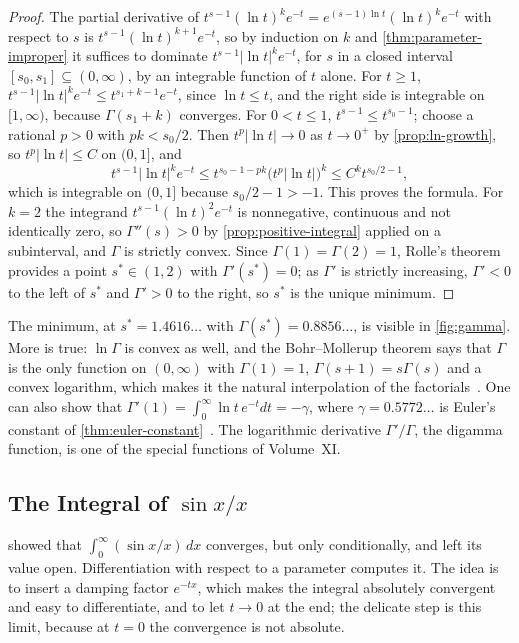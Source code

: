 \begin{proof}
The partial derivative of $t^{s-1}(\ln t)^ke^{-t}=e^{(s-1)\ln t}(\ln t)^ke^{-t}$ with respect to $s$ is $t^{s-1}(\ln t)^{k+1}e^{-t}$, so by induction on $k$ and \cref{thm:parameter-improper} it suffices to dominate $t^{s-1}|\ln t|^ke^{-t}$, for $s$ in a closed interval $[s_0,s_1]\subseteq(0,\infty)$, by an integrable function of $t$ alone. For $t\ge1$, $t^{s-1}|\ln t|^ke^{-t}\le t^{s_1+k-1}e^{-t}$, since $\ln t\le t$, and the right side is integrable on $[1,\infty)$, because $\Gamma(s_1+k)$ converges. For $0<t\le1$, $t^{s-1}\le t^{s_0-1}$; choose a rational $p>0$ with $pk<s_0/2$. Then $t^{p}|\ln t|\to0$ as $t\to0^+$ by \cref{prop:ln-growth}, so $t^p|\ln t|\le C$ on $(0,1]$, and
\[
t^{s-1}|\ln t|^ke^{-t}\le t^{s_0-1-pk}\bigl(t^p|\ln t|\bigr)^k\le C^kt^{s_0/2-1},
\]
which is integrable on $(0,1]$ because $s_0/2-1>-1$. This proves the formula. For $k=2$ the integrand $t^{s-1}(\ln t)^2e^{-t}$ is nonnegative, continuous and not identically zero, so $\Gamma''(s)>0$ by \cref{prop:positive-integral} applied on a subinterval, and $\Gamma$ is strictly convex. Since $\Gamma(1)=\Gamma(2)=1$, Rolle's theorem provides a point $s^*\in(1,2)$ with $\Gamma'(s^*)=0$; as $\Gamma'$ is strictly increasing, $\Gamma'<0$ to the left of $s^*$ and $\Gamma'>0$ to the right, so $s^*$ is the unique minimum.
\end{proof}

The minimum, at $s^*=1.4616\ldots$ with $\Gamma(s^*)=0.8856\ldots$, is visible in \cref{fig:gamma}. More is true: $\ln\Gamma$ is convex as well, and the Bohr--Mollerup theorem says that $\Gamma$ is the only function on $(0,\infty)$ with $\Gamma(1)=1$, $\Gamma(s+1)=s\Gamma(s)$ and a convex logarithm, which makes it the natural interpolation of the factorials~\cite{artin1964gamma}. One can also show that $\Gamma'(1)=\int_0^\infty\ln t\,e^{-t}dt=-\gamma$, where $\gamma=0.5772\ldots$ is Euler's constant of \cref{thm:euler-constant}~\cite{havil2003gamma}. The logarithmic derivative $\Gamma'/\Gamma$, the digamma function, is one of the special functions of Volume~XI.

\subsection{The Integral of \texorpdfstring{$\sin x/x$}{sin x / x}}

 showed that $\int_0^\infty(\sin x/x)\,dx$ converges, but only conditionally, and left its value open. Differentiation with respect to a parameter computes it. The idea is to insert a damping factor $e^{-tx}$, which makes the integral absolutely convergent and easy to differentiate, and to let $t\to0$ at the end; the delicate step is this limit, because at $t=0$ the convergence is not absolute.

